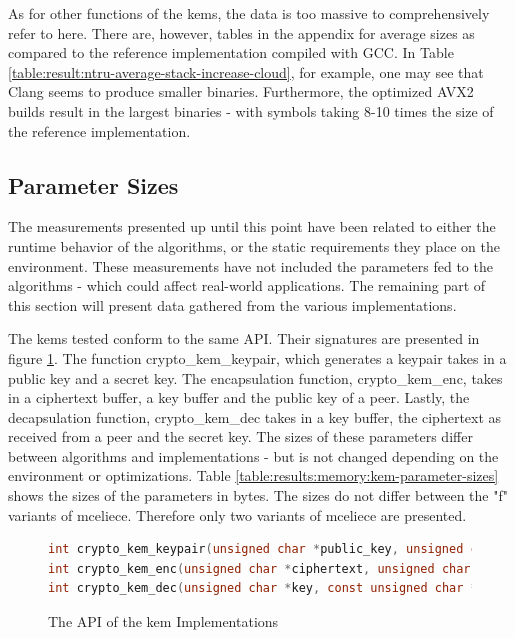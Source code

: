 As for other functions of the \glspl{kem}, the data is too massive to comprehensively refer to here. There are, however, tables in the appendix for average sizes as compared to the reference implementation compiled with GCC. In Table \ref{table:result:ntru-average-stack-increase-cloud}, for example, one may see that Clang seems to produce smaller binaries. Furthermore, the optimized AVX2 builds result in the largest binaries - with symbols taking 8-10 times the size of the reference implementation.


\subsection{Parameter Sizes}

The measurements presented up until this point have been related to either the runtime behavior of the algorithms, or the static requirements they place on the environment. These measurements have not included the parameters fed to the algorithms - which could affect real-world applications. The remaining part of this section will present data gathered from the various implementations.

The \glspl{kem} tested conform to the same API. Their signatures are presented in figure \ref{figure:result:memory:kem-api}. The function crypto\_kem\_keypair, which generates a keypair takes in a public key and a secret key. The encapsulation function, crypto\_kem\_enc, takes in a ciphertext buffer, a key buffer and the public key of a peer. Lastly, the decapsulation function, crypto\_kem\_dec takes in a key buffer, the ciphertext as received from a peer and the secret key. The sizes of these parameters differ between algorithms and implementations - but is not changed depending on the environment or optimizations. Table \ref{table:results:memory:kem-parameter-sizes} shows the sizes of the parameters in bytes. The sizes do not differ between the "f" variants of \gls{mceliece}. Therefore only two variants of \gls{mceliece} are presented.

\begin{figure}
    \centering
    \begin{lstlisting}[language=C]
int crypto_kem_keypair(unsigned char *public_key, unsigned char *private_key);
int crypto_kem_enc(unsigned char *ciphertext, unsigned char *key, const unsigned char *public_key);
int crypto_kem_dec(unsigned char *key, const unsigned char *ciphertext, const unsigned char *private_key);
    \end{lstlisting}
    \caption{The API of the \gls{kem} Implementations}
    \label{figure:result:memory:kem-api}
\end{figure}

